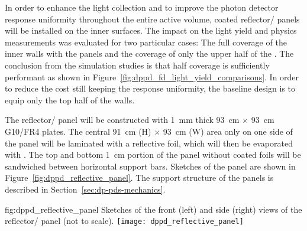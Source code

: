 In order to enhance the light collection and to improve the photon detector response uniformity throughout the entire  active volume,  coated reflector/ panels will be installed on the  inner surfaces. The impact on the light yield and physics measurements was evaluated for two particular cases: The full coverage of the  inner walls with the panels and the coverage of only the upper half of the . The conclusion from the simulation studies is that half coverage is sufficiently performant as shown in Figure~\ref{fig:dppd_fd_light_yield_comparisons}. In order to reduce the cost still keeping the  response uniformity, the baseline design is to equip only the top half of the  walls.

The reflector/ panel will be constructed with \SI{1}{\mm} thick \SI{93}{\cm} $\times$ \SI{93}{\cm} G10/FR4 plates. The central \SI{91}{\cm} (H) $\times$ \SI{93}{\cm} (W) area only on one side of the panel will be laminated with a reflective foil, which will then be evaporated with . The top and bottom \SI{1}{\cm} portion of the panel without coated foils will be sandwiched between horizontal support bars. Sketches of the panel are shown in Figure~\ref{fig:dppd_reflective_panel}. The support structure of the panels is described in Section~\ref{sec:dp-pds-mechanics}. 
\begin{dunefigure}{fig:dppd_reflective_panel}
{Sketches of the front (left) and side (right) views of the reflector/ panel (not to scale).}
\texttt{[image: dppd\_reflective\_panel]}
\end{dunefigure}
